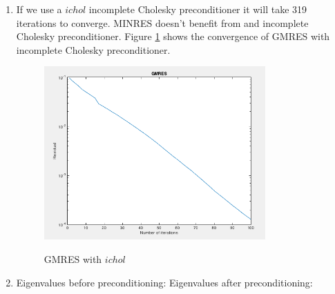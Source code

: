 \documentclass{article}
\begin{document}
\begin{enumerate}
\item 

If we use a $ichol$ incomplete Cholesky preconditioner it will take 319 iterations to converge. MINRES doesn't benefit from and incomplete Cholesky preconditioner.  Figure \ref{fig:problem1_2} shows the convergence of GMRES with incomplete Cholesky preconditioner. \\

\begin{figure} 
\includegraphics[width=0.8\textwidth]{GMRES_ICHOL} 
\label{fig:problem1_2}
\caption{GMRES with $ichol$} 
\end{figure}

\item 
Eigenvalues before preconditioning: 
Eigenvalues after preconditioning: 




\end{enumerate} 
\end{document}
